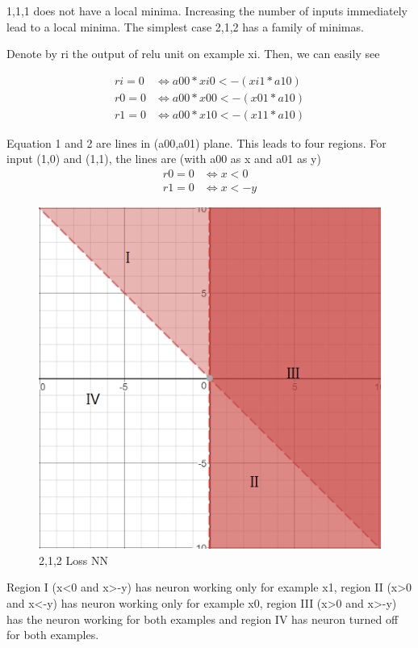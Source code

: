 \documentclass[conference]{IEEEtran}
\begin{document}
1,1,1 does not have a local minima. Increasing the number of inputs immediately lead to a local minima. The simplest case 2,1,2 has a family of minimas.

Denote by ri the output of relu unit on example xi. Then, we can easily see

\begin{align}
ri = 0 &\iff a00*xi0 < -(xi1*a10) \\
r0 = 0 &\iff a00*x00 < -(x01*a10) \\
r1 = 0 &\iff a00*x10 < -(x11*a10)
\end{align}

Equation 1 and 2 are lines in (a00,a01) plane. This leads to four regions. For input (1,0) and (1,1), the lines are (with a00 as x and a01 as y)
\begin{align}
r0 = 0 &\iff x < 0 \\
r1 = 0 &\iff x < -y
\end{align}

\begin{figure}
	\includegraphics[width=\linewidth]{images/nn/212loss.png}
	\caption{2,1,2 Loss NN}
	\label{fig:212loss}
\end{figure}

Region I (x<0 and x>-y) has neuron working only for example x1, region II (x>0 and x<-y) has neuron working only for example x0, region III (x>0 and x>-y) has the neuron working for both examples and region IV has neuron turned off for both examples.
\end{document}
